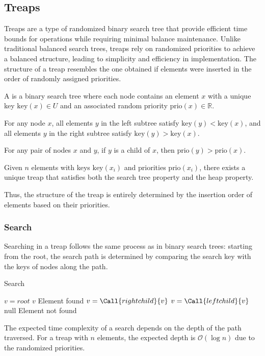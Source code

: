 \subsection{Treaps}
Treaps are a type of randomized binary search tree that provide efficient time bounds for operations while requiring minimal balance maintenance.
Unlike traditional balanced search trees, treaps rely on randomized priorities to achieve a balanced structure, leading to simplicity and efficiency in implementation.
The structure of a treap resembles the one obtained if elements were inserted in the order of randomly assigned priorities.
\begin{definition}
    A is a binary search tree where each node contains an element $x$ with a unique key $\text{key}(x) \in U$ and an associated random priority $\text{prio}(x) \in \mathbb{R}$.
\end{definition}
\begin{property}
    For any node $x$, all elements $y$ in the left subtree satisfy $\text{key}(y) < \text{key}(x)$, and all elements $y$ in the right subtree satisfy $\text{key}(y) > \text{key}(x)$.
\end{property}
\begin{property}[Heap]
    For any pair of nodes $x$ and $y$, if $y$ is a child of $x$, then $\text{prio}(y) > \text{prio}(x)$.
\end{property}
\begin{lemma}
    Given $n$ elements with keys $\text{key}(x_i)$ and priorities $\text{prio}(x_i)$, there exists a unique treap that satisfies both the search tree property and the heap property.
\end{lemma}
Thus, the structure of the treap is entirely determined by the insertion order of elements based on their priorities.

\subsubsection{Search}
Searching in a treap follows the same process as in binary search trees: starting from the root, the search path is determined by comparing the search key with the keys of nodes along the path.
\begin{algorithm}[H]
    \caption{Search}
    \begin{algorithmic}[1]
        \State $v = root$
                \State \Return $v$ \Comment Element found
            \EndIf
                \State $v = \Call{rightchild}{v}$
            \EndIf
                \State $v = \Call{leftchild}{v}$
            \EndIf
        \EndWhile
        \State \Return $\text{null}$ \Comment Element not found
    \end{algorithmic}
\end{algorithm}
The expected time complexity of a search depends on the depth of the path traversed. 
For a treap with $n$ elements, the expected depth is $\mathcal{O}(\log n)$ due to the randomized priorities.

